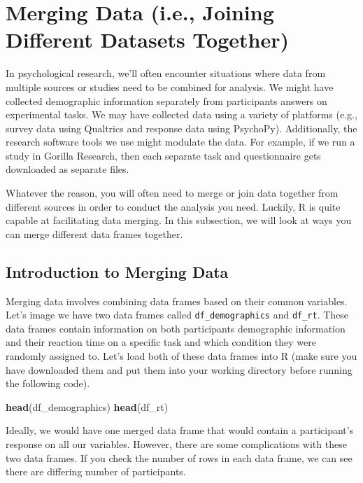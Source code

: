 \documentclass[
]{book}
\newenvironment{Shaded}{\begin{snugshade}}{\end{snugshade}}
\newcommand{\FunctionTok}[1]{\textcolor[rgb]{0.13,0.29,0.53}{\textbf{#1}}}
\newcommand{\NormalTok}[1]{#1}
\begin{document}
\hypertarget{merging-data-i.e.-joining-different-datasets-together}{%
\section{Merging Data (i.e., Joining Different Datasets Together)}\label{merging-data-i.e.-joining-different-datasets-together}}

In psychological research, we'll often encounter situations where data from multiple sources or studies need to be combined for analysis. We might have collected demographic information separately from participants answers on experimental tasks. We may have collected data using a variety of platforms (e.g., survey data using Qualtrics and response data using PsychoPy). Additionally, the research software tools we use might modulate the data. For example, if we run a study in Gorilla Research, then each separate task and questionnaire gets downloaded as separate files.

Whatever the reason, you will often need to merge or join data together from different sources in order to conduct the analysis you need. Luckily, R is quite capable at facilitating data merging. In this subsection, we will look at ways you can merge different data frames together.

\hypertarget{introduction-to-merging-data}{%
\subsection{Introduction to Merging Data}\label{introduction-to-merging-data}}

Merging data involves combining data frames based on their common variables. Let's image we have two data frames called \texttt{df\_demographics} and \texttt{df\_rt}. These data frames contain information on both participants demographic information and their reaction time on a specific task and which condition they were randomly assigned to. Let's load both of these data frames into R (make sure you have downloaded them and put them into your working directory before running the following code).

\begin{Shaded}
\begin{Highlighting}[]
\FunctionTok{head}\NormalTok{(df\_demographics)}
\FunctionTok{head}\NormalTok{(df\_rt)}
\end{Highlighting}
\end{Shaded}

Ideally, we would have one merged data frame that would contain a participant's response on all our variables. However, there are some complications with these two data frames. If you check the number of rows in each data frame, we can see there are differing number of participants.
\end{document}
